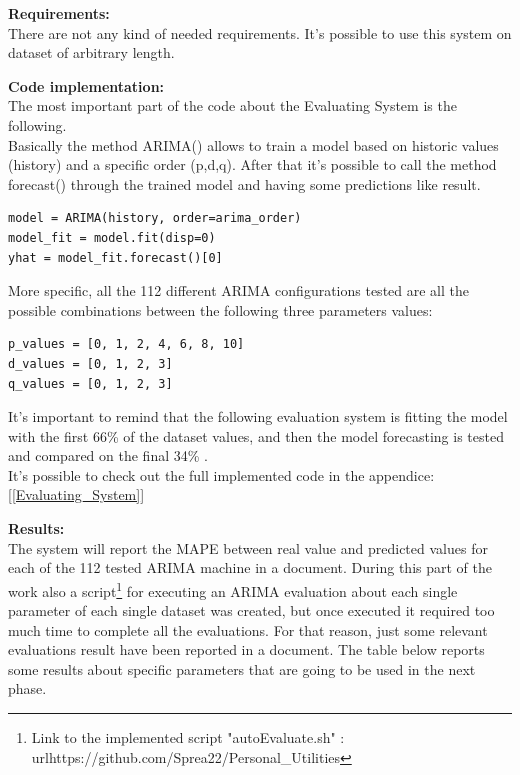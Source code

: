 \textbf{Requirements:}\\
There are not any kind of needed requirements. It's possible to use this system on dataset of arbitrary length.

\textbf{Code implementation:}\\
The most important part of the code about the Evaluating System is the following.\\
Basically the method ARIMA() allows to train a model based on historic values (history) and a specific order (p,d,q). After that it's possible to call the method forecast() through the trained model and having some predictions like result.
\begin{lstlisting}
model = ARIMA(history, order=arima_order)
model_fit = model.fit(disp=0)
yhat = model_fit.forecast()[0]
\end{lstlisting}

More specific, all the 112 different ARIMA configurations tested are all the possible combinations between the following three parameters values:
\begin{lstlisting}
p_values = [0, 1, 2, 4, 6, 8, 10]
d_values = [0, 1, 2, 3]
q_values = [0, 1, 2, 3]
\end{lstlisting}

It's important to remind that the following evaluation system is fitting the model with the first 66\% of the dataset values, and then the model forecasting is tested and compared on the final 34\% .\\

It's possible to check out the full implemented code in the appendice: [\ref{Evaluating_System}]

\newpage

\textbf{Results:}\\
The system will report the MAPE between real value and predicted values for each of the 112 tested ARIMA machine in a document.
During this part of the work also a script\footnote{Link to the implemented script "autoEvaluate.sh" : \\url{https://github.com/Sprea22/Personal\_Utilities}} for executing an ARIMA evaluation about each single parameter of each single dataset was created, but once executed it required too much time to complete all the evaluations.
For that reason, just some relevant evaluations result have been reported in a document. The table below reports some results about specific parameters that are going to be used in the next phase.\\

